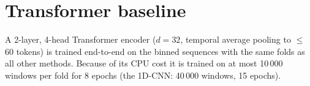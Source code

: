\documentclass[10pt]{article}
\begin{document}
\section{Transformer baseline}
A 2-layer, 4-head Transformer encoder ($d=32$, temporal average pooling to $\le$60 tokens) is trained end-to-end on the binned sequences with the same folds as all other methods. Because of its CPU cost it is trained on at most 10\,000 windows per fold for 8 epochs (the 1D-CNN: 40\,000 windows, 15 epochs).
\begin{table}[!htbp]
\centering
\caption{Transformer baseline vs.\ ECTA and the 1D-CNN (AUROC).}\label{tab:s_tf}
\footnotesize
{}
\end{table}
\end{document}
